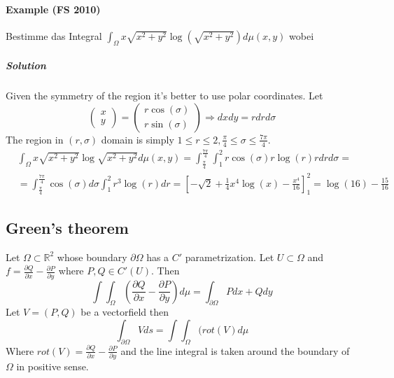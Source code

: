 \documentclass[11pt,a4paper]{book}
\begin{document}
\paragraph*{Example (FS 2010)}
Bestimme das Integral $\int_\Omega x\sqrt{x^2+y^2} \log(\sqrt{x^2+y^2}) d\mu(x,y)$
wobei 
\subparagraph*{Solution}
Given the symmetry of the region it's better to use polar coordinates. Let $$\begin{pmatrix}
x \\ 
y
\end{pmatrix}= \begin{pmatrix}
r \cos(\sigma) \\ 
r \sin(\sigma)
\end{pmatrix}  \Rightarrow dxdy=rdrd\sigma$$
The region in $(r,\sigma)$ domain is simply $1\leq r\leq 2, \frac{\pi}{4}\leq \sigma \leq \frac{7\pi}{4}$.
\begin{align*}
& \int_\Omega x\sqrt{x^2+y^2} \log \sqrt{x^2+y^2} d\mu(x,y)= \int_{\frac{\pi}{4}}^{\frac{7\pi}{4}} \int_1^2 r \cos (\sigma) r \log(r) r dr d\sigma = \\
& = \int_{\frac{\pi}{4}}^{\frac{7\pi}{4}} \cos(\sigma)d\sigma \int_1^2 r^3 \log(r) dr = \left[-\sqrt{2}+\frac{1}{4}x^4\log(x) -\frac{x^4}{16} \right]_1^2= \log(16)-\frac{15}{16}
\end{align*}

\subsection{Green's theorem}
Let $\Omega \subset \mathbb{R}^2$ whose boundary $\partial \Omega$ has a $C'$ parametrization. Let $U\subset \Omega$ and $f=\frac{\partial Q}{\partial x}-\frac{\partial P}{\partial y}$ where $P,Q \in C'(U)$. Then
$$\int \int_\Omega \left(\frac{\partial Q}{\partial x}-\frac{\partial P}{\partial y}\right) d\mu = \int_{\partial \Omega} Pdx+Qdy$$
Let $V=(P,Q)$ be a vectorfield then $$\int_{\partial \Omega} V ds= \int \int_\Omega (rot(V) d\mu$$
Where $rot(V)=\frac{\partial Q}{\partial x}-\frac{\partial P}{\partial y}$ and the line integral is taken around the boundary of $\Omega$ in positive sense.
\end{document}
